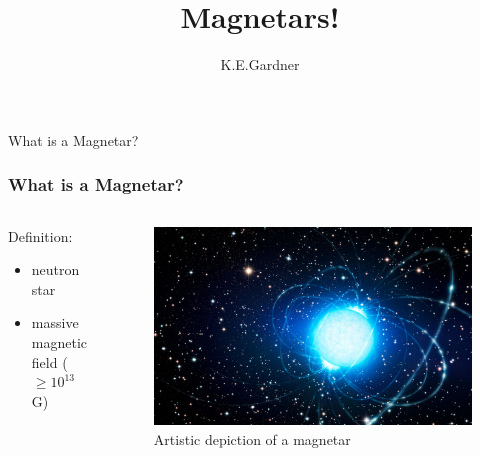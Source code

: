 \documentclass[hyperref=pdftex, presentation]{beamer}
\title[Introduction to Magnetars] %
{Magnetars!}
\author[Gardner]{K.E.Gardner}
\institute[] {UTU - Department of Physics and Astronomy\\}
\date[\today]
\begin{document}
\begin{frame}
	\vspace*{-.5cm}
  \titlepage
\end{frame}




\begin{frame}{\Large What is a Magnetar?}
\frametitle{\Large What is a Magnetar?}

\begin{minipage}[0.2\textheight]{\textwidth}
\begin{columns}[T]
\begin{column}{0.5\textwidth}

\begin{block}{Definition:}

\begin{itemize}
 \item<2-> neutron star%
 \item<3-> massive magnetic field ($\ge 10^{13}$ G)
\end{itemize}
\end{block}

\end{column}
\begin{column}{0.5\textwidth}
	\begin{figure}
		\includegraphics[scale=.09]{figures/magnetar_art.jpg}
		\caption{Artistic depiction of a magnetar}
	\end{figure}
\end{column}
\end{columns}
\end{minipage}

\end{frame}
\end{document}

